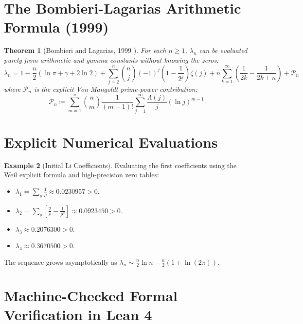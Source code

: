 \documentclass[11pt,a4paper]{article}
\newtheorem{theorem}{Theorem}[section]
\theoremstyle{definition}
\newtheorem{example}[theorem]{Example}
\begin{document}
\section{The Bombieri-Lagarias Arithmetic Formula (1999)}

\begin{theorem}[Bombieri and Lagarias, 1999 \cite{bombieri_lagarias1999}]\label{thm:bombieri_lagarias}
For each $n \ge 1$, $\lambda_n$ can be evaluated purely from arithmetic and gamma constants without knowing the zeros:
\begin{equation}\label{eq:bl_formula}
\lambda_n = 1 - \frac{n}{2}(\ln \pi + \gamma + 2\ln 2) + \sum_{j=2}^n \binom{n}{j} (-1)^j \left( 1 - \frac{1}{2^j} \right) \zeta(j) + n \sum_{k=1}^\infty \left( \frac{1}{2k} - \frac{1}{2k+n} \right) + \mathcal{P}_n
\end{equation}
where $\mathcal{P}_n$ is the explicit Von Mangoldt prime-power contribution:
\[ \mathcal{P}_n \coloneqq \sum_{m=1}^n \binom{n}{m} \frac{1}{(m-1)!} \sum_{j=1}^\infty \frac{\Lambda(j)}{j} (\ln j)^{m-1} \]
\end{theorem}

\section{Explicit Numerical Evaluations}

\begin{example}[Initial Li Coefficients]\label{ex:li_evals}
Evaluating the first coefficients using the Weil explicit formula and high-precision zero tables:
\begin{itemize}
    \item $\lambda_1 = \sum_\rho \frac{1}{\rho} \approx 0.0230957 > 0$.
    \item $\lambda_2 = \sum_\rho \left[ \frac{2}{\rho} - \frac{1}{\rho^2} \right] \approx 0.0923450 > 0$.
    \item $\lambda_3 \approx 0.2076300 > 0$.
    \item $\lambda_4 \approx 0.3670500 > 0$.
\end{itemize}
The sequence grows asymptotically as $\lambda_n \sim \frac{n}{2} \ln n - \frac{n}{2} (1 + \ln(2\pi))$.
\end{example}

\section{Machine-Checked Formal Verification in Lean 4}
\end{document}
